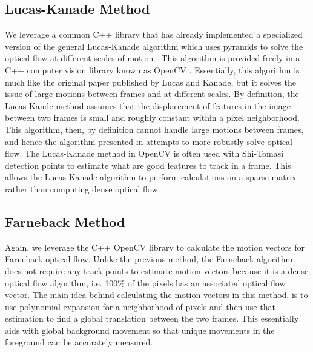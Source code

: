 \subsection{\label{subsection:lucas_kanade} Lucas-Kanade Method}
We leverage a common C++ library that has already implemented a specialized
version of the general Lucas-Kanade algorithm which uses pyramids to solve the
optical flow at different scales of motion \cite{bouguet2001pyramidal}. This
algorithm is provided freely in a C++ computer vision library known as OpenCV
\cite{itseez2015opencv}. Essentially, this algorithm is much like the original
paper published by Lucas and Kanade, but it solves the issue of large motions
between frames and at different scales. By definition, the Lucas-Kande method
assumes that the displacement of features in the image between two frames is
small and roughly constant within a pixel neighborhood. This algorithm, then, by
definition cannot handle large motions between frames, and hence the algorithm
presented in \cite{bouguet2001pyramidal} attempts to more robustly solve optical
flow. The Lucas-Kanade method in OpenCV is often used with Shi-Tomasi
\cite{shi1994good} detection points to estimate what are good features to track
in a frame. This allows the Lucas-Kanade algorithm to perform calculations on a
sparse matrix rather than computing dense optical flow.

\subsection{\label{subsection:farneback_method}Farneback Method} Again, we
leverage the C++ OpenCV library to calculate the motion vectors for Farneback
optical flow. Unlike the previous method, the Farneback algorithm does not
require any track points to estimate motion vectors because it is a dense
optical flow algorithm, i.e. 100\% of the pixels has an associated optical flow
vector. The main idea behind calculating the motion vectors in this method, is
to use polynomial expansion for a neighborhood of pixels \cite{farneback2003two}
and then use that estimation to find a global translation between the two
frames. This essentially aids with global background movement so that unique
movements in the foreground can be accurately measured.

